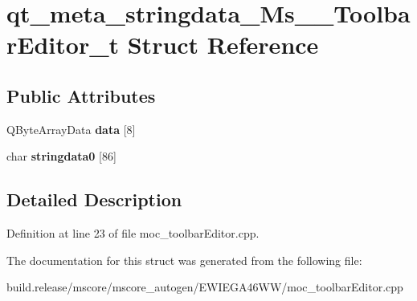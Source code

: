 \hypertarget{structqt__meta__stringdata___ms_____toolbar_editor__t}{}\section{qt\+\_\+meta\+\_\+stringdata\+\_\+\+Ms\+\_\+\+\_\+\+Toolbar\+Editor\+\_\+t Struct Reference}
\label{structqt__meta__stringdata___ms_____toolbar_editor__t}
\subsection*{Public Attributes}
\begin{DoxyCompactItemize}
\item 
\mbox{\label{structqt__meta__stringdata___ms_____toolbar_editor__t_acced6015f8b4d0263e6f6d162a63f19c}} 
Q\+Byte\+Array\+Data {\bfseries data} \mbox{[}8\mbox{]}
\item 
\mbox{\label{structqt__meta__stringdata___ms_____toolbar_editor__t_a340eefbe51d1625986c79adac625c774}} 
char {\bfseries stringdata0} \mbox{[}86\mbox{]}
\end{DoxyCompactItemize}


\subsection{Detailed Description}


Definition at line 23 of file moc\+\_\+toolbar\+Editor.\+cpp.



The documentation for this struct was generated from the following file\+:\begin{DoxyCompactItemize}
\item 
build.\+release/mscore/mscore\+\_\+autogen/\+E\+W\+I\+E\+G\+A46\+W\+W/moc\+\_\+toolbar\+Editor.\+cpp\end{DoxyCompactItemize}
